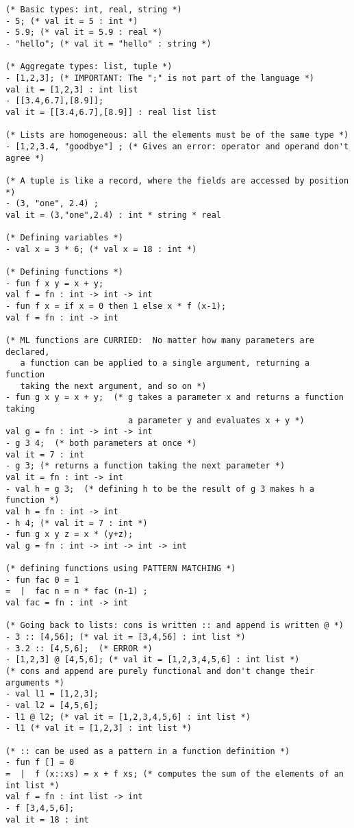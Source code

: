 \documentclass[10pt]{article}
\begin{document}
\begin{verbatim}
(* Basic types: int, real, string *)
- 5; (* val it = 5 : int *)
- 5.9; (* val it = 5.9 : real *)
- "hello"; (* val it = "hello" : string *)

(* Aggregate types: list, tuple *)
- [1,2,3]; (* IMPORTANT: The ";" is not part of the language *)
val it = [1,2,3] : int list
- [[3.4,6.7],[8.9]];
val it = [[3.4,6.7],[8.9]] : real list list

(* Lists are homogeneous: all the elements must be of the same type *)
- [1,2,3.4, "goodbye"] ; (* Gives an error: operator and operand don't agree *)

(* A tuple is like a record, where the fields are accessed by position *)
- (3, "one", 2.4) ;
val it = (3,"one",2.4) : int * string * real

(* Defining variables *)
- val x = 3 * 6; (* val x = 18 : int *)

(* Defining functions *)
- fun f x y = x + y; 
val f = fn : int -> int -> int
- fun f x = if x = 0 then 1 else x * f (x-1);
val f = fn : int -> int

(* ML functions are CURRIED:  No matter how many parameters are declared, 
   a function can be applied to a single argument, returning a function 
   taking the next argument, and so on *)
- fun g x y = x + y;  (* g takes a parameter x and returns a function taking 
                         a parameter y and evaluates x + y *)
val g = fn : int -> int -> int
- g 3 4;  (* both parameters at once *)
val it = 7 : int
- g 3; (* returns a function taking the next parameter *)
val it = fn : int -> int
- val h = g 3;  (* defining h to be the result of g 3 makes h a function *)
val h = fn : int -> int
- h 4; (* val it = 7 : int *)
- fun g x y z = x * (y+z);
val g = fn : int -> int -> int -> int

(* defining functions using PATTERN MATCHING *)
- fun fac 0 = 1
=  |  fac n = n * fac (n-1) ;
val fac = fn : int -> int

(* Going back to lists: cons is written :: and append is written @ *)
- 3 :: [4,56]; (* val it = [3,4,56] : int list *)
- 3.2 :: [4,5,6];  (* ERROR *)
- [1,2,3] @ [4,5,6]; (* val it = [1,2,3,4,5,6] : int list *)
(* cons and append are purely functional and don't change their arguments *)
- val l1 = [1,2,3];
- val l2 = [4,5,6];
- l1 @ l2; (* val it = [1,2,3,4,5,6] : int list *)
- l1 (* val it = [1,2,3] : int list *)

(* :: can be used as a pattern in a function definition *)
- fun f [] = 0
=  |  f (x::xs) = x + f xs; (* computes the sum of the elements of an int list *)
val f = fn : int list -> int
- f [3,4,5,6];
val it = 18 : int


\end{verbatim}
\end{document}
